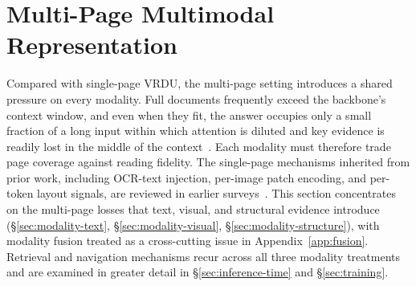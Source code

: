 \documentclass[11pt]{article}
\begin{document}

\section{Multi-Page Multimodal Representation}
\label{sec:modality}
Compared with single-page VRDU, the multi-page setting introduces a shared pressure on every modality. Full documents frequently exceed the backbone's context window, and even when they fit, the answer occupies only a small fraction of a long input within which attention is diluted and key evidence is readily lost in the middle of the context~\cite{liu2024lost}. Each modality must therefore trade page coverage against reading fidelity. The single-page mechanisms inherited from prior work, including OCR-text injection, per-image patch encoding, and per-token layout signals, are reviewed in earlier surveys~\cite{ding2025survey}. This section concentrates on the multi-page losses that text, visual, and structural evidence introduce (§\ref{sec:modality-text}, §\ref{sec:modality-visual}, §\ref{sec:modality-structure}), with modality fusion treated as a cross-cutting issue in Appendix~\ref{app:fusion}. Retrieval and navigation mechanisms recur across all three modality treatments and are examined in greater detail in §\ref{sec:inference-time} and §\ref{sec:training}.
\end{document}
